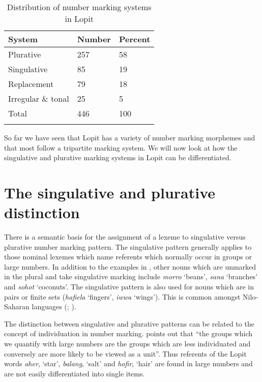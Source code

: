 \documentclass[output=paper]{langsci/langscibook}
\begin{document}
\begin{table}
\begin{tabularx}{\textwidth}{XXX}
\lsptoprule

  {System } &   {Number} &   {Percent}\\ 
\midrule
Plurative & 257 & 58\\
Singulative & 85 & 19\\
Replacement & 79 & 18\\
Irregular \& tonal & 25 & 5\\
\midrule 
Total & 446 & 100\\
\lspbottomrule
\end{tabularx}
\caption{Distribution of number marking systems in Lopit}
\label{tab:moodie:5}
\end{table}

So far we have seen that Lopit has a variety of number marking morphemes and that most follow a tripartite marking system. We will now look at how the singulative and plurative marking systems in Lopit can be differentiated.

\section{The singulative and plurative distinction}\label{sec:moodie:3}

There is a semantic basis for the assignment of a lexeme to singulative versus plurative number marking pattern. The singulative pattern generally applies to those nominal lexemes which name referents which normally occur in groups or large numbers. In addition to the examples in , other nouns which are unmarked in the plural and take singulative marking include \textit{morro} ‘beans’, \textit{sana} ‘branches’ and \textit{sohot} ‘coconuts’. The singulative pattern is also used for nouns which are in pairs or finite sets (\textit{hafiela} ‘fingers’, \textit{iwwa} ‘wings’). This is common amongst Nilo-Saharan languages (\citealt[216]{Dimmendaal2000}; \citealt[119]{Creisselsetal2008}).

The distinction between singulative and plurative patterns can be related to the concept of individuation in number marking. \citet[217]{Corbett2000} points out that “the groups which we quantify with large numbers are the groups which are less individuated and conversely are more likely to be viewed as a unit”. Thus referents of the Lopit words \textit{aher}, ‘star’, \textit{balang}, ‘salt’ and \textit{hofir}, ‘hair’ are found in large numbers and are not easily differentiated into single items.
\end{document}
